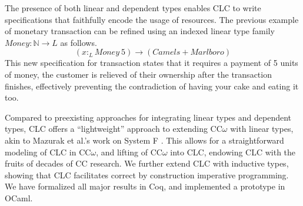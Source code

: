 \documentclass[sigplan,screen,review,authordraft]{acmart}
\theoremstyle{definition}
\newcommand{\ltype}{:_{\scriptscriptstyle L}}
\begin{document}
  The presence of both linear and dependent types enables CLC to write specifications that faithfully encode the usage of resources. The previous example of monetary transaction can be refined using an indexed linear type family $Money : \mathbb{N} \rightarrow L$ as follows.
  \begin{equation*}
    (x \ltype Money\ 5) \rightarrow (Camels + Marlboro)
  \end{equation*}
  This new specification for transaction states that it requires a payment of 5 units of money, the customer is relieved of their ownership after the transaction finishes, effectively preventing the contradiction of having your cake and eating it too.

  Compared to preexisting approaches for integrating linear types and dependent types, CLC offers a ``lightweight'' approach to extending CC$\omega$ with linear types, akin to Mazurak et al.'s work on System F \cite{mazurak}. This allows for a straightforward modeling of CLC in CC$\omega$, and lifting of CC$\omega$ into CLC, endowing CLC with the fruits of decades of CC research. We further extend CLC with inductive types, showing that CLC facilitates correct by construction imperative programming. We have formalized all major results in Coq, and implemented a prototype in OCaml. 

  \medskip
\end{document}
